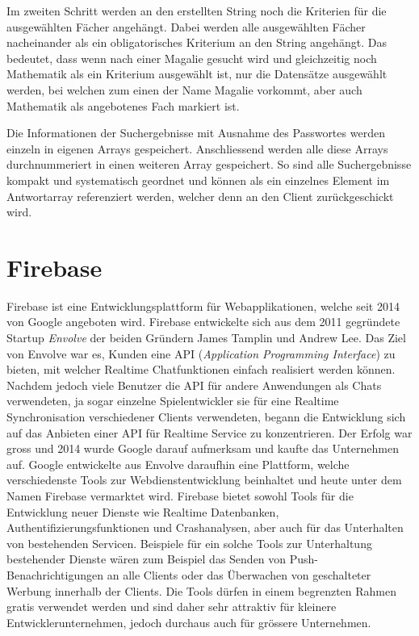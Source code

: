 \documentclass[a4paper,11pt]{report}
\begin{document}
					Im zweiten Schritt werden an den erstellten String noch die Kriterien für die ausgewählten Fächer angehängt. Dabei werden alle ausgewählten Fächer nacheinander als ein obligatorisches Kriterium an den String angehängt. Das bedeutet, dass wenn nach einer \glqq Magalie\grqq{} gesucht wird und gleichzeitig noch Mathematik als ein Kriterium ausgewählt ist, nur die Datensätze ausgewählt werden, bei welchen zum einen der Name \glqq Magalie\grqq{} vorkommt, aber auch Mathematik als angebotenes Fach markiert ist.
					
					Die Informationen der Suchergebnisse mit Ausnahme des Passwortes werden einzeln in eigenen Arrays gespeichert. Anschliessend werden alle diese Arrays durchnummeriert in einen weiteren Array gespeichert. So sind alle Suchergebnisse kompakt und systematisch geordnet und können als ein einzelnes Element im Antwortarray referenziert werden, welcher denn an den Client zurückgeschickt wird.
					
					
			\section{Firebase} \label{fb}
			Firebase ist eine  Entwicklungsplattform für Webapplikationen, welche seit 2014 von Google angeboten wird. Firebase entwickelte sich aus dem 2011 gegründete Startup \emph{Envolve} der beiden Gründern James Tamplin und Andrew Lee. Das Ziel von Envolve war es, Kunden eine API (\emph{Application Programming Interface}) zu bieten, mit welcher Realtime Chatfunktionen einfach realisiert werden können. Nachdem jedoch viele Benutzer die API für andere Anwendungen als Chats verwendeten, ja sogar einzelne Spielentwickler sie für eine Realtime Synchronisation verschiedener Clients verwendeten, begann die Entwicklung sich auf das Anbieten einer API für Realtime Service zu konzentrieren. Der Erfolg war gross und 2014 wurde Google darauf aufmerksam und kaufte das Unternehmen auf. Google entwickelte aus Envolve daraufhin eine Plattform, welche verschiedenste Tools zur Webdienstentwicklung beinhaltet und heute unter dem Namen Firebase vermarktet wird. Firebase bietet sowohl Tools für die Entwicklung neuer Dienste wie Realtime Datenbanken, Authentifizierungsfunktionen und Crashanalysen, aber auch für das Unterhalten von bestehenden Servicen. Beispiele für ein solche Tools zur Unterhaltung bestehender Dienste wären zum Beispiel das Senden von Push-Benachrichtigungen an alle Clients oder das Überwachen von geschalteter Werbung innerhalb der Clients. Die Tools dürfen in einem begrenzten Rahmen gratis verwendet werden und sind daher sehr attraktiv für kleinere Entwicklerunternehmen, jedoch durchaus auch für grössere Unternehmen.\cite{Firebase}
				
\end{document}
